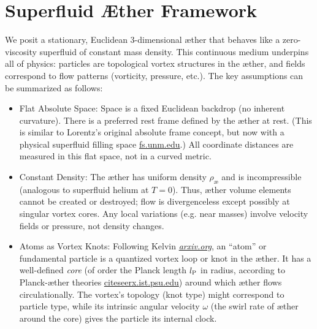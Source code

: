 \documentclass[aps,preprint,superscriptaddress]{revtex4}
\begin{document}
    \section*{Superfluid Æther Framework}

    We posit a stationary, Euclidean 3-dimensional æther that behaves like a zero-viscosity superfluid of constant mass density. This continuous medium underpins all of physics: particles are topological vortex structures in the æther, and fields correspond to flow patterns (vorticity, pressure, etc.). The key assumptions can be summarized as follows:

    \begin{itemize}
        \item
        Flat Absolute Space: Space is a fixed Euclidean backdrop (no inherent curvature). There is a preferred rest frame defined by the æther at rest. (This is similar to Lorentz’s original absolute frame concept, but now with a physical superfluid filling space
        \href{https://fs.unm.edu/QuantizationDiscretization.pdf#:~:text=Winterberg%20,an%20equal%20number%20of%20positive}{fs.unm.edu}.) All coordinate distances are measured in this flat space, not in a curved metric.

        \item
        Constant Density: The æther has uniform density $\rho_{\text{\ae}}$ and is incompressible (analogous to superfluid helium at $T=0$). Thus, æther volume elements cannot be created or destroyed; flow is divergenceless except possibly at singular vortex cores. Any local variations (e.g. near masses) involve velocity fields or pressure, not density changes.

        \item
        Atoms as Vortex Knots: Following Kelvin
        \href{https://arxiv.org/pdf/2012.07395#:~:text=Thomson%20,on%20the%20right%20path%20when}{\textit{arxiv.org}}, an “atom” or fundamental particle is a quantized vortex loop or knot in the æther. It has a well-defined \textit{core} (of order the Planck length $l_{\rm P}$ in radius, according to Planck-æther theories
        \href{https://citeseerx.ist.psu.edu/document?repid=rep1&type=pdf&doi=25483f1ebc9dc442a9f1505a49d96eb35e92e3f4#:~:text=45,on%20General%20Relativity%20and%20Relativistic}{citeseerx.ist.psu.edu}) around which æther flows circulationally. The vortex’s topology (knot type) might correspond to particle type, while its intrinsic angular velocity $\omega$ (the swirl rate of æther around the core) gives the particle its internal clock.


\end{itemize}
\end{document}
